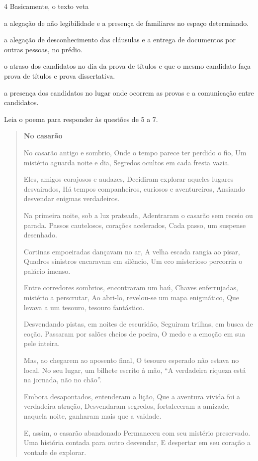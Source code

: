 \num{4} Basicamente, o texto veta

\begin{escolha}
\item a alegação de não legibilidade e a presença de familiares no espaço
determinado.

\item a alegação de desconhecimento das cláusulas e a entrega de
documentos por outras pessoas, no prédio.

\item o atraso dos candidatos no dia da prova de títulos e que o mesmo
candidato faça prova de títulos e prova dissertativa.

\item a presença dos candidatos no lugar onde ocorrem as provas e a
comunicação entre candidatos.
\end{escolha}

Leia o poema para responder às questões de 5 a 7.

\begin{quote}
\textbf{No casarão}


No casarão antigo e sombrio, Onde o tempo parece ter perdido o fio, Um
mistério aguarda noite e dia, Segredos ocultos em cada fresta vazia.

Eles, amigos corajosos e audazes, Decidiram explorar aqueles lugares
desvairados, Há tempos companheiros, curiosos e aventureiros, Ansiando
desvendar enigmas verdadeiros.

Na primeira noite, sob a luz prateada, Adentraram o casarão sem receio
ou parada. Passos cautelosos, corações acelerados, Cada passo, um
suspense desenhado.

Cortinas empoeiradas dançavam no ar, A velha escada rangia ao pisar,
Quadros sinistros encaravam em silêncio, Um eco misterioso percorria o
palácio imenso.

Entre corredores sombrios, encontraram um baú, Chaves enferrujadas,
mistério a perscrutar, Ao abri-lo, revelou-se um mapa enigmático, Que
levava a um tesouro, tesouro fantástico.

Desvendando pistas, em noites de escuridão, Seguiram trilhas, em busca
de eoção. Passaram por salões cheios de poeira, O medo e a emoção em sua
pele inteira.

Mas, ao chegarem ao aposento final, O tesouro esperado não estava no
local. No seu lugar, um bilhete escrito à mão, ``A verdadeira riqueza
está na jornada, não no chão''.

Embora desapontados, entenderam a lição, Que a aventura vivida foi a
verdadeira atração, Desvendaram segredos, fortaleceram a amizade,
naquela noite, ganharam mais que a vaidade.

E, assim, o casarão abandonado Permaneceu com seu mistério preservado.
Uma história contada para outro desvendar, E despertar em seu coração a
vontade de explorar.

\end{quote}

